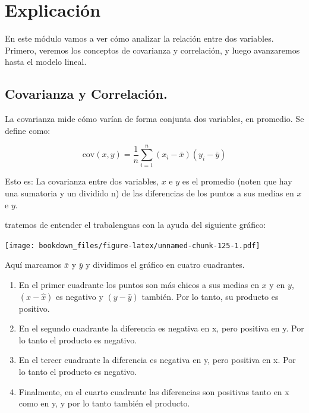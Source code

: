 \documentclass[]{book}
\newenvironment{Shaded}{\begin{snugshade}}{\end{snugshade}}
\newcommand{\DataTypeTok}[1]{\textcolor[rgb]{0.13,0.29,0.53}{#1}}
\newcommand{\KeywordTok}[1]{\textcolor[rgb]{0.13,0.29,0.53}{\textbf{#1}}}
\newcommand{\NormalTok}[1]{#1}
\newcommand{\OperatorTok}[1]{\textcolor[rgb]{0.81,0.36,0.00}{\textbf{#1}}}
\newcommand{\OtherTok}[1]{\textcolor[rgb]{0.56,0.35,0.01}{#1}}
\providecommand{\tightlist}{%
  \setlength{\itemsep}{0pt}\setlength{\parskip}{0pt}}
\begin{document}
\hypertarget{explicacion-5}{%
\section{Explicación}\label{explicacion-5}}

En este módulo vamos a ver cómo analizar la relación entre dos variables. Primero, veremos los conceptos de covarianza y correlación, y luego avanzaremos hasta el modelo lineal.

\begin{Shaded}
\end{Shaded}

\hypertarget{covarianza-y-correlacion.}{%
\subsection{Covarianza y Correlación.}\label{covarianza-y-correlacion.}}

La covarianza mide cómo varían de forma conjunta dos variables, en promedio. Se define como:

\[
\text{cov}(x,y)=\frac{1}{n}\sum_{i=1}^n(x_i-\bar x)(y_i-\bar y)
\]

Esto es: La covarianza entre dos variables, \(x\) e \(y\) es el promedio (noten que hay una sumatoria y un dividido n) de las diferencias de los puntos a sus medias en \(x\) e \(y\).

tratemos de entender el trabalenguas con la ayuda del siguiente gráfico:

\texttt{[image: bookdown\_files/figure-latex/unnamed-chunk-125-1.pdf]}

Aquí marcamos \(\bar x\) y \(\bar y\) y dividimos el gráfico en cuatro cuadrantes.

\begin{enumerate}
\def\labelenumi{\arabic{enumi}.}
\tightlist
\item
  En el primer cuadrante los puntos son más chicos a sus medias en \(x\) y en \(y\), \((x-\hat x)\) es negativo y \((y-\hat y)\) también. Por lo tanto, su producto es positivo.
\item
  En el segundo cuadrante la diferencia es negativa en x, pero positiva en y. Por lo tanto el producto es negativo.
\item
  En el tercer cuadrante la diferencia es negativa en y, pero positiva en x. Por lo tanto el producto es negativo.
\item
  Finalmente, en el cuarto cuadrante las diferencias son positivas tanto en x como en y, y por lo tanto también el producto.
\end{enumerate}
\end{document}
